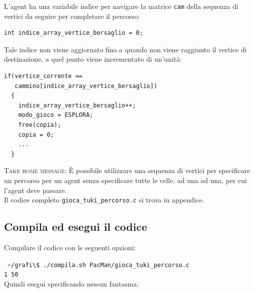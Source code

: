\documentclass[8pt]{book}
\begin{document}
L'agent ha una variabile indice per navigare la matrice \texttt{cam} della sequenza di vertici da seguire per completare il percorso:

\begin{spacing}{0.9}
  \begin{small}
    \begin{tcolorbox}
\begin{verbatim}
int indice_array_vertice_bersaglio = 0;
\end{verbatim}
  \end{tcolorbox}
    \end{small}
      \end{spacing}

Tale indice non viene aggiornato fino a quando non viene raggiunto il vertice di destinazione, a quel punto viene incrementato di un'unità:

\begin{spacing}{0.9}
  \begin{small}
    \begin{tcolorbox}
\begin{verbatim}
if(vertice_corrente == 
   cammino[indice_array_vertice_bersaglio])
  {
    indice_array_vertice_bersaglio++;
    modo_gioco = ESPLORA;
    free(copia);
    copia = 0;
    ...
  }
\end{verbatim}
  \end{tcolorbox}
    \end{small}
      \end{spacing}


\textsc{Take home message:} È possibile utilizzare una sequenza di vertici per specificare un percorso per un agent senza specificare tutte le celle, ad una ad una, per cui l'agent deve passare.\\

Il codice completo \texttt{gioca\_tuki\_percorso.c} si trova in appendice.

\subsection{Compila ed esegui il codice}

Compilare il codice con le seguenti opzioni:

\texttt{
  \newline
  \textasciitilde{}/grafi\textbackslash{}\$ ./compila.sh PacMan/gioca\_tuki\_percorso.c\\ 1 50
  }\\

Quindi esegui specificando nessun fantasma:
\end{document}
